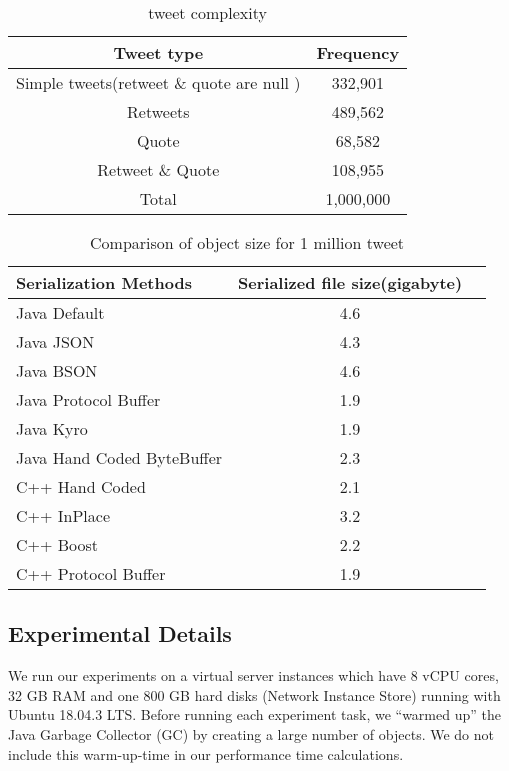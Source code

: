 \begin{table}
	\centering
	\caption{tweet complexity }
	\label{tbl:object_size}
	\begin{adjustbox}{width=\columnwidth,center}	
		
		\begin{tabular}{|c|c|} \hline
			Tweet type & Frequency\\ \hline
			Simple tweets(retweet \& quote are null ) & 332,901\\ \hline
			Retweets & 489,562\\ \hline
			Quote & 68,582\\ \hline
			Retweet \& Quote & 108,955\\ \hline
			Total & 1,000,000 \\ \hline
			
			\hline\end{tabular}
	\end{adjustbox}
\end{table}

\begin{table}
	\centering
	\caption{Comparison of object size for 1 million tweet }
	\label{tbl:object_size}
	\begin{adjustbox}{width=\columnwidth,center}	
		
		\begin{tabular}{|l|c|c|} \hline
		 \textbf{Serialization Methods} & \textbf{Serialized file size(gigabyte)}\\ \hline
			Java Default  & 4.6 \\ \hline	
			Java JSON  & 4.3 \\ \hline	
			Java BSON  & 4.6 \\ \hline	
			Java Protocol Buffer  & 1.9 \\ \hline	
			Java Kyro  & 1.9 \\ \hline	
			Java Hand Coded ByteBuffer  & 2.3 \\ \hline	
			C++ Hand Coded  & 2.1 \\ \hline	
			C++ InPlace  & 3.2 \\ \hline	
			C++ Boost  & 2.2 \\ \hline	
			C++ Protocol Buffer  & 1.9 \\ \hline					
			\hline\end{tabular}
	\end{adjustbox}
\end{table}


\subsection{Experimental Details}
We run our experiments on a virtual server instances which have 8 vCPU cores, 32 GB RAM and one 800
GB hard disks (Network Instance Store) running with Ubuntu 18.04.3 LTS. Before running each experiment task, we “warmed up” the Java Garbage Collector (GC) by creating a large number of objects. We do not include this warm-up-time in our performance time calculations.

